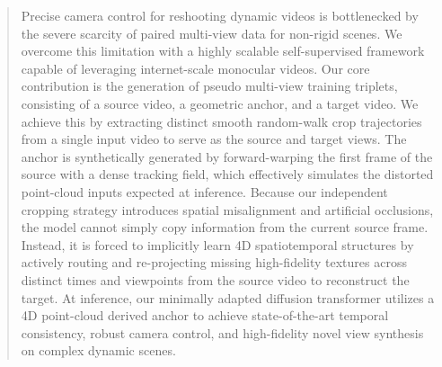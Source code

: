 \begin{abstract}
Precise camera control for reshooting dynamic videos is bottlenecked by the severe scarcity of paired multi-view data for non-rigid scenes. We overcome this limitation with a highly scalable self-supervised framework capable of leveraging internet-scale monocular videos. Our core contribution is the generation of pseudo multi-view training triplets, consisting of a source video, a geometric anchor, and a target video. We achieve this by extracting distinct smooth random-walk crop trajectories from a single input video to serve as the source and target views. The anchor is synthetically generated by forward-warping the first frame of the source with a dense tracking field, which effectively simulates the distorted point-cloud inputs expected at inference. Because our independent cropping strategy introduces spatial misalignment and artificial occlusions, the model cannot simply copy information from the current source frame. Instead, it is forced to implicitly learn 4D spatiotemporal structures by actively routing and re-projecting missing high-fidelity textures across distinct times and viewpoints from the source video to reconstruct the target. At inference, our minimally adapted diffusion transformer utilizes a 4D point-cloud derived anchor to achieve state-of-the-art temporal consistency, robust camera control, and high-fidelity novel view synthesis on complex dynamic scenes.
\end{abstract}
